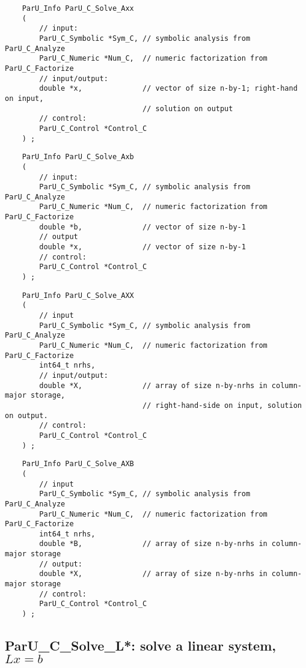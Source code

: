 \documentclass[12pt]{article}
\begin{document}
    {\footnotesize
    \begin{verbatim}
    ParU_Info ParU_C_Solve_Axx
    (
        // input:
        ParU_C_Symbolic *Sym_C, // symbolic analysis from ParU_C_Analyze
        ParU_C_Numeric *Num_C,  // numeric factorization from ParU_C_Factorize
        // input/output:
        double *x,              // vector of size n-by-1; right-hand on input,
                                // solution on output
        // control:
        ParU_C_Control *Control_C
    ) ; \end{verbatim} }

    {\footnotesize
    \begin{verbatim}
    ParU_Info ParU_C_Solve_Axb
    (
        // input:
        ParU_C_Symbolic *Sym_C, // symbolic analysis from ParU_C_Analyze
        ParU_C_Numeric *Num_C,  // numeric factorization from ParU_C_Factorize
        double *b,              // vector of size n-by-1
        // output
        double *x,              // vector of size n-by-1
        // control:
        ParU_C_Control *Control_C
    ) ; \end{verbatim} }

    {\footnotesize
    \begin{verbatim}
    ParU_Info ParU_C_Solve_AXX
    (
        // input
        ParU_C_Symbolic *Sym_C, // symbolic analysis from ParU_C_Analyze
        ParU_C_Numeric *Num_C,  // numeric factorization from ParU_C_Factorize
        int64_t nrhs,
        // input/output:
        double *X,              // array of size n-by-nrhs in column-major storage,
                                // right-hand-side on input, solution on output.
        // control:
        ParU_C_Control *Control_C
    ) ; \end{verbatim} }

    {\footnotesize
    \begin{verbatim}
    ParU_Info ParU_C_Solve_AXB
    (
        // input
        ParU_C_Symbolic *Sym_C, // symbolic analysis from ParU_C_Analyze
        ParU_C_Numeric *Num_C,  // numeric factorization from ParU_C_Factorize
        int64_t nrhs,
        double *B,              // array of size n-by-nrhs in column-major storage
        // output:
        double *X,              // array of size n-by-nrhs in column-major storage
        // control:
        ParU_C_Control *Control_C
    ) ; \end{verbatim} }

\subsection{{\sf ParU\_C\_Solve\_L*}: solve a linear system, $Lx=b$}
\end{document}
